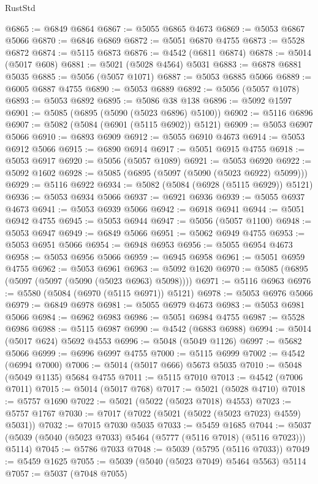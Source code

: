 \begin{lexlean}{RustStd}
\begin{coremodule}
@6865 := @6849 @6864
@6867 := @5055 @6865 @4673
@6869 := @5053 @6867 @5066
@6870 := @6846 @6869
@6872 := @5051 @6870 @4755
@6873 := @5528 @6872
@6874 := @5115 @6873
@6876 := @4542 (@6811 @6874)
@6878 := @5014 (@5017 @608)
@6881 := @5021 (@5028 @4564) @5031
@6883 := @6878 @6881 @5035
@6885 := @5056 (@5057 @1071)
@6887 := @5053 @6885 @5066
@6889 := @6005 @6887 @4755
@6890 := @5053 @6889
@6892 := @5056 (@5057 @1078)
@6893 := @5053 @6892
@6895 := @5086 @38 @138
@6896 := @5092 @1597
@6901 := @5085 (@6895 (@5090 (@5023 @6896) @5100))
@6902 := @5116 @6896
@6907 := @5082 (@5084 (@6901 (@5115 @6902)) @5121)
@6909 := @5053 @6907 @5066
@6910 := @6893 @6909
@6912 := @5055 @6910 @4673
@6914 := @5053 @6912 @5066
@6915 := @6890 @6914
@6917 := @5051 @6915 @4755
@6918 := @5053 @6917
@6920 := @5056 (@5057 @1089)
@6921 := @5053 @6920
@6922 := @5092 @1602
@6928 := @5085 (@6895 (@5097 (@5090 (@5023 @6922) @5099)))
@6929 := @5116 @6922
@6934 := @5082 (@5084 (@6928 (@5115 @6929)) @5121)
@6936 := @5053 @6934 @5066
@6937 := @6921 @6936
@6939 := @5055 @6937 @4673
@6941 := @5053 @6939 @5066
@6942 := @6918 @6941
@6944 := @5051 @6942 @4755
@6945 := @5053 @6944
@6947 := @5056 (@5057 @1100)
@6948 := @5053 @6947
@6949 := @6849 @5066
@6951 := @5062 @6949 @4755
@6953 := @5053 @6951 @5066
@6954 := @6948 @6953
@6956 := @5055 @6954 @4673
@6958 := @5053 @6956 @5066
@6959 := @6945 @6958
@6961 := @5051 @6959 @4755
@6962 := @5053 @6961
@6963 := @5092 @1620
@6970 := @5085 (@6895 (@5097 (@5097 (@5090 (@5023 @6963) @5098))))
@6971 := @5116 @6963
@6976 := @5580 (@5084 (@6970 (@5115 @6971)) @5121)
@6978 := @5053 @6976 @5066
@6979 := @6849 @6978
@6981 := @5055 @6979 @4673
@6983 := @5053 @6981 @5066
@6984 := @6962 @6983
@6986 := @5051 @6984 @4755
@6987 := @5528 @6986
@6988 := @5115 @6987
@6990 := @4542 (@6883 @6988)
@6994 := @5014 (@5017 @624) @5692 @4553
@6996 := @5048 (@5049 @1126)
@6997 := @5682 @5066
@6999 := @6996 @6997 @4755
@7000 := @5115 @6999
@7002 := @4542 (@6994 @7000)
@7006 := @5014 (@5017 @666) @5673 @5035
@7010 := @5048 (@5049 @1135) @5684 @4755
@7011 := @5115 @7010
@7013 := @4542 (@7006 @7011)
@7015 := @5014 (@5017 @768)
@7017 := @5021 (@5028 @4710)
@7018 := @5757 @1690
@7022 := @5021 (@5022 (@5023 @7018) @4553)
@7023 := @5757 @1767
@7030 := @7017 (@7022 (@5021 (@5022 (@5023 @7023) @4559) @5031))
@7032 := @7015 @7030 @5035
@7033 := @5459 @1685
@7044 := @5037 (@5039 (@5040 (@5023 @7033) @5464 (@5777 (@5116 @7018) (@5116 @7023))) @5114)
@7045 := @5786 @7033
@7048 := @5039 (@5795 (@5116 @7033))
@7049 := @5459 @1625
@7055 := @5039 (@5040 (@5023 @7049) @5464 @5563) @5114
@7057 := @5037 (@7048 @7055)

\end{coremodule}
\end{lexlean}
